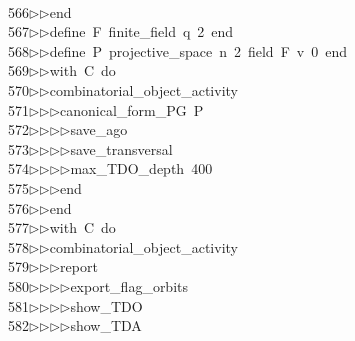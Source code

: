 \begin{tabbing}
\>\ \\[0pt]
566\>$\triangleright$\>$\triangleright$\>end\ \\[0pt]
567\>$\triangleright$\>$\triangleright$\>define\ F\ finite\_field\ q\ 2\ end\ \\[0pt]
568\>$\triangleright$\>$\triangleright$\>define\ P\ projective\_space\ n\ 2\ field\ F\ v\ 0\ end\ \\[0pt]
569\>$\triangleright$\>$\triangleright$\>with\ C\ do\ \\[0pt]
570\>$\triangleright$\>$\triangleright$\>combinatorial\_object\_activity\ \\[0pt]
571\>$\triangleright$\>$\triangleright$\>$\triangleright$\>canonical\_form\_PG\ P\ \\[0pt]
572\>$\triangleright$\>$\triangleright$\>$\triangleright$\>$\triangleright$\>save\_ago\ \\[0pt]
573\>$\triangleright$\>$\triangleright$\>$\triangleright$\>$\triangleright$\>save\_transversal\ \\[0pt]
574\>$\triangleright$\>$\triangleright$\>$\triangleright$\>$\triangleright$\>max\_TDO\_depth\ 400\ \\[0pt]
575\>$\triangleright$\>$\triangleright$\>$\triangleright$\>end\ \\[0pt]
576\>$\triangleright$\>$\triangleright$\>end\ \\[0pt]
577\>$\triangleright$\>$\triangleright$\>with\ C\ do\ \\[0pt]
578\>$\triangleright$\>$\triangleright$\>combinatorial\_object\_activity\ \\[0pt]
579\>$\triangleright$\>$\triangleright$\>$\triangleright$\>report\ \\[0pt]
580\>$\triangleright$\>$\triangleright$\>$\triangleright$\>$\triangleright$\>export\_flag\_orbits\ \\[0pt]
581\>$\triangleright$\>$\triangleright$\>$\triangleright$\>$\triangleright$\>show\_TDO\ \\[0pt]
582\>$\triangleright$\>$\triangleright$\>$\triangleright$\>$\triangleright$\>show\_TDA\ \\[0pt]

\end{tabbing}
